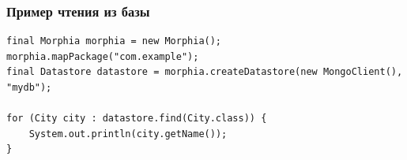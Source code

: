 \documentclass[xetex,mathserif,serif]{beamer}
\begin{document}
	\begin{frame}[fragile]
		\frametitle{Пример чтения из базы}
		\begin{footnotesize}
			\begin{verbatim}
final Morphia morphia = new Morphia();
morphia.mapPackage("com.example");
final Datastore datastore = morphia.createDatastore(new MongoClient(), "mydb");

for (City city : datastore.find(City.class)) {
    System.out.println(city.getName());
}
			\end{verbatim}
		\end{footnotesize}
	\end{frame}
\end{document}
